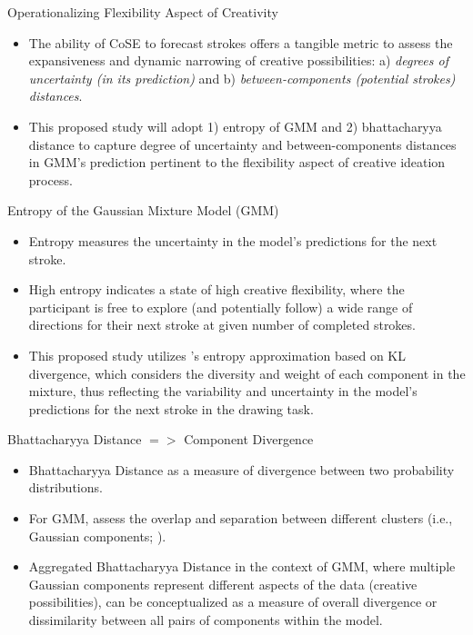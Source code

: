 \documentclass[pdf]{beamer}
\begin{document}
\begin{frame}{Operationalizing Flexibility Aspect of Creativity}
\begin{itemize}
    \item<1-> The ability of CoSE to forecast strokes offers a tangible metric to assess the expansiveness and dynamic narrowing of creative possibilities: a) \textit{degrees of uncertainty (in its prediction)} and b) \textit{between-components (potential strokes) distances}.
    \vspace{1em}
    \item<2-> This proposed study will adopt 1) \alert{entropy of GMM} and 2) \alert{bhattacharyya distance} to capture degree of uncertainty and between-components distances in GMM’s prediction pertinent to the flexibility aspect of creative ideation process.
\end{itemize}
\end{frame}

\begin{frame}{Entropy of the Gaussian Mixture Model (GMM)}
\begin{itemize}
    \item<1-> Entropy measures the \alert{uncertainty} in the model's predictions for the next stroke. 
    \item<2-> High entropy indicates a state of high creative flexibility, where the participant is free to explore (and potentially follow) a wide range of directions for their next stroke at given number of completed strokes. 
    \item<3-> This proposed study utilizes \textcite{huber_entropy_2008}'s \alert{entropy approximation based on KL divergence}, which considers the diversity and weight of each component in the mixture, thus reflecting the variability and uncertainty in the model’s predictions for the next stroke in the drawing task.
\end{itemize}
\end{frame}

\begin{frame}{Bhattacharyya Distance $=>$ Component Divergence}
    \begin{itemize}
        \item<1-> Bhattacharyya Distance as a measure of divergence between two probability distributions.
        \item<1-> For GMM, assess the overlap and separation between different clusters (i.e., Gaussian components; \cite{alangari_intrinsically_2023}).
        \item<2-> Aggregated Bhattacharyya Distance in the context of GMM, where multiple Gaussian components represent different aspects of the data (creative possibilities), can be conceptualized as a measure of overall divergence or dissimilarity between all pairs of components within the model.
    \end{itemize}
\end{frame}
\end{document}
